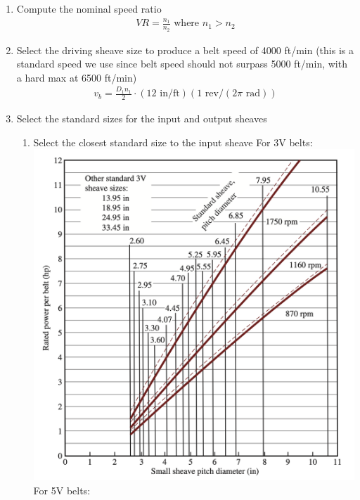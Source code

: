 \documentclass[11pt, fleqn]{article}
\begin{document}
\begin{enumerate}
    \item Compute the nominal speed ratio
    \begin{align*}
        VR=\frac{n_1}{n_2} \text{ where } n_1 > n_2
    \end{align*}
    \item Select the driving sheave size to produce a belt speed of 4000 ft/min (this is a standard speed we use since belt speed should not surpass 5000 ft/min, with a hard max at 6500 ft/min)
    \begin{align*}
        v_b=\frac{D_1n_1}{2}\cdot(12 \text{ in/ft})(1 \text{ rev/}(2\pi\text{ rad}))
    \end{align*}
    \item Select the standard sizes for the input and output sheaves\\
    \begin{enumerate}
        \item Select the closest standard size to the input sheave
        For 3V belts:\\
        \includegraphics[scale=0.3]{Belts/standard_3V.png}\\
        For 5V belts:\\

\end{enumerate}
\end{enumerate}
\end{document}
